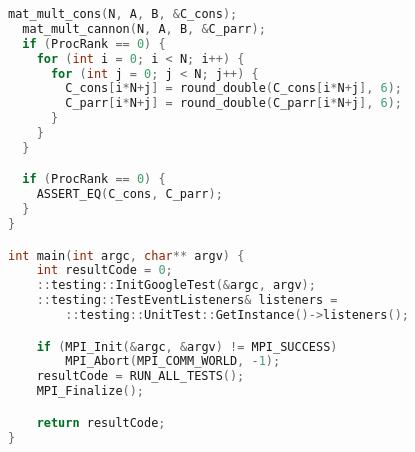 \documentclass{report}
\begin{document}
\begin{lstlisting}[language=C++]
  mat_mult_cons(N, A, B, &C_cons);
  mat_mult_cannon(N, A, B, &C_parr);
  if (ProcRank == 0) {
    for (int i = 0; i < N; i++) {
      for (int j = 0; j < N; j++) {
        C_cons[i*N+j] = round_double(C_cons[i*N+j], 6);
        C_parr[i*N+j] = round_double(C_parr[i*N+j], 6);
      }
    }
  }

  if (ProcRank == 0) {
    ASSERT_EQ(C_cons, C_parr);
  }
}

int main(int argc, char** argv) {
    int resultCode = 0;
    ::testing::InitGoogleTest(&argc, argv);
    ::testing::TestEventListeners& listeners =
        ::testing::UnitTest::GetInstance()->listeners();

    if (MPI_Init(&argc, &argv) != MPI_SUCCESS)
        MPI_Abort(MPI_COMM_WORLD, -1);
    resultCode = RUN_ALL_TESTS();
    MPI_Finalize();

    return resultCode;
}
\end{lstlisting}
\end{document}
